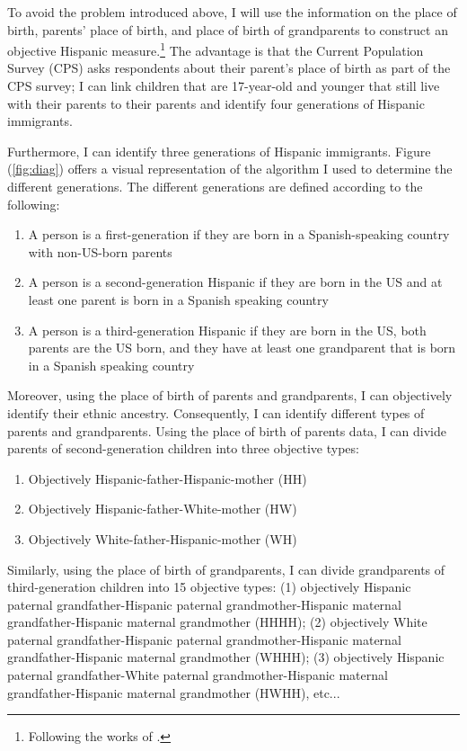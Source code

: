 \documentclass[12pt, fullpage]{article}
\begin{document}


To avoid the problem introduced above, I will use the information on the place of birth, parents' place of birth, and place of birth of grandparents to construct an objective Hispanic measure.\footnote{Following the works of \citet{antmanEthnicAttritionObserved2016,antmanEthnicAttritionAssimilation2020}.} The advantage is that the Current Population Survey (CPS) asks respondents about their parent's place of birth as part of the CPS survey; I can link children that are 17-year-old and younger that still live with their parents to their parents and identify four generations of Hispanic immigrants. 


Furthermore, I can identify three generations of Hispanic immigrants. Figure (\ref{fig:diag}) offers a visual representation of the algorithm I used to determine the different generations. The different generations are defined according to the following: 

\begin{enumerate}
\item A person is a first-generation if they are born in a Spanish-speaking country with non-US-born parents
\item A person is a second-generation Hispanic if they are born in the US and at least one parent is born in a Spanish speaking country
\item A person is a third-generation Hispanic if they are born in the US, both parents are the US born, and they have at least one grandparent that is born in a Spanish speaking country
\end{enumerate}

Moreover, using the place of birth of parents and grandparents, I can objectively identify their ethnic ancestry. Consequently, I can identify different types of parents and grandparents. Using the place of birth of parents data, I can divide parents of second-generation children into three objective types: 
\begin{enumerate}
\item Objectively Hispanic-father-Hispanic-mother (HH)
\item Objectively Hispanic-father-White-mother (HW)
\item Objectively White-father-Hispanic-mother (WH)
\end{enumerate}

Similarly, using the place of birth of grandparents, I can divide grandparents of third-generation children into 15 objective types: (1) objectively Hispanic paternal grandfather-Hispanic paternal grandmother-Hispanic maternal grandfather-Hispanic maternal grandmother (HHHH); (2) objectively White paternal grandfather-Hispanic paternal grandmother-Hispanic maternal grandfather-Hispanic maternal grandmother (WHHH); (3) objectively Hispanic paternal grandfather-White paternal grandmother-Hispanic maternal grandfather-Hispanic maternal grandmother (HWHH), etc...
\end{document}
